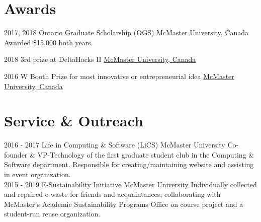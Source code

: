 \documentclass[letterpaper]{twentysecondcv} %
\begin{document}
\section{Awards}

\vspace{-.5em}
\begin{twenty}
  \twentyitem
  {2017,}
  {2018}
  {Ontario Graduate Scholarship (OGS)}
	{\href{https://www.mcmaster.ca/}{McMaster University, Canada}}
	{}
	{Awarded \$15,000 both years.}

	\twentyitem
	{2018}
	{}
	{3rd prize at DeltaHacks II}
	{\href{https://www.mcmaster.ca/}{McMaster University, Canada}}
	{}
	{}
	
	\twentyitem
	{2016}
	{}
	{W Booth Prize for most innovative or entrepreneurial idea}
	{\href{https://www.mcmaster.ca/}{McMaster University, Canada}}
	{}
	{}
\end{twenty}

\vspace{-.5em}
\section{Service \& Outreach}
\vspace{-.5em}
\begin{twenty}
	\twentyitem
	{2016 -}
	{2017}
	{Life in Computing \& Software (LiCS)}
	{McMaster University}
	{}
	{Co-founder \& VP-Technology of the first graduate student club in the Computing \& Software department. Responsible for creating/maintaining website and assisting in event organization.}
\\
\twentyitem
{2015 -}
{2019}
{E-Sustainability Initiative}
{McMaster University}
{}
{Individually collected and repaired e-waste for friends and acquaintances; collaborating with McMaster's Academic Sustainability Programs Office on course project and a student-run reuse organization.}
\end{twenty}

\vspace{-.5em}
\end{document}
